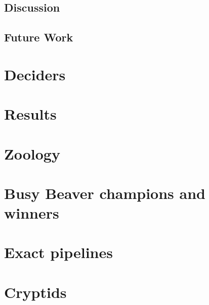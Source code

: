 \documentclass[a4paper,british]{article}
\theoremstyle{definition} %
\numberwithin{equation}{section}
\theoremstyle{definition} %
\begin{document}


\newpage
\subsection{Discussion}\label{sec:intro:discuss}


\subsection{Future Work}

\newpage


\newpage


\newpage
\section{Deciders}\label{sec:deciders}







% 

\newpage




\newpage


\newpage
\section{Results}\label{sec:results}

\newpage
\section{Zoology}\label{sec:zoo}



\newpage


\appendix


\section{Busy Beaver champions and winners}\label{app:lowerbounds}
\section{Exact pipelines}\label{app:pipelines}
\section{Cryptids}\label{app:cryptids}
\end{document}
